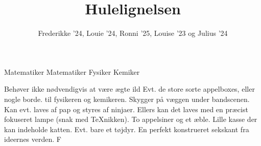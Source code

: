\documentclass[a4paper,11pt]{article}
\title{Hulelignelsen}
\author{Frederikke '24, Louie '24, Ronni '25, Louise '23 og Julius '24}
\begin{document}
\maketitle

\begin{roles}
 Matematiker
 Matematiker
 Fysiker
 Kemiker
\end{roles}

\begin{props}
     Behøver ikke nødvendigvis at være ægte ild
     Evt. de store sorte appelboxes, eller nogle borde. 
     til fysikeren og kemikeren.
     Skygger på væggen under bandscenen. Kan evt. laves af pap og styres af ninjaer. Ellers kan det laves med en præcist fokuseret lampe (snak med \TeX nikken).
     To appelsiner og et æble.
     Lille kasse der kan indeholde katten.
     Evt. bare et tøjdyr.
     En perfekt konstrueret sekskant fra ideernes verden.
     F
\end{props}
\end{document}
